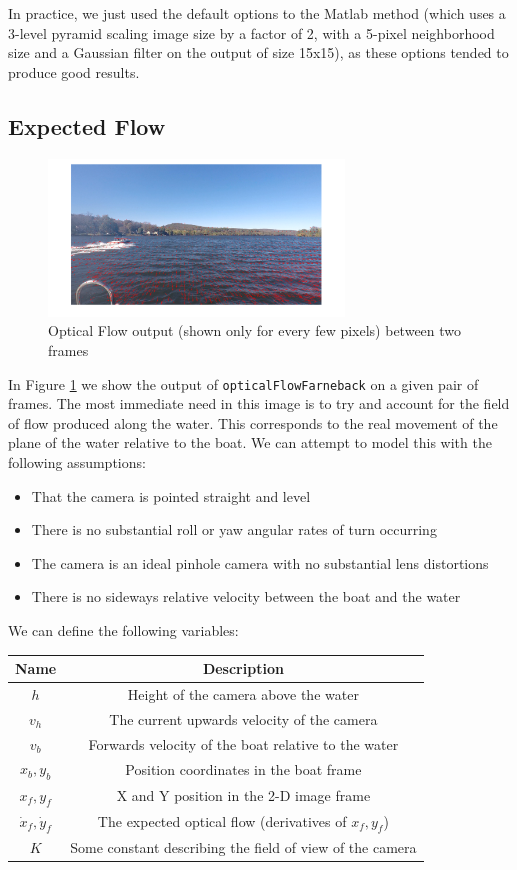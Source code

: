 \documentclass{article}
\begin{document}
In practice, we just used the default options to the Matlab method (which uses
a 3-level pyramid scaling image size by a factor of 2, with a 5-pixel
neighborhood size and a Gaussian filter on the output of size 15x15), as these
options tended to produce good results.

\subsection{Expected Flow} \label{expected_flow}

\begin{figure}[H]
\centering
\includegraphics[width=0.7\textwidth]{example_flow.png}
\caption{Optical Flow output (shown only for every few pixels) between two
frames}
\label{fig:example_flow}
\end{figure}

In Figure \ref{fig:example_flow} we show the output of
\texttt{opticalFlowFarneback} on a given pair of frames. The most immediate need
in this image is to try and account for the field of flow produced along the
water. This corresponds to the real movement of the plane of the water relative
to the boat. We can attempt to model this with the following assumptions:
\begin{itemize}
\item That the camera is pointed straight and level
\item There is no substantial roll or yaw angular rates of turn occurring
\item The camera is an ideal pinhole camera with no substantial lens distortions
\item There is no sideways relative velocity between the boat and the water
\end{itemize}

We can define the following variables:

\begin{tabular}{c|c}
Name & Description \\ \hline
$h$ & Height of the camera above the water \\
$v_h$ & The current upwards velocity of the camera \\
$v_b$ & Forwards velocity of the boat relative to the water \\
$x_b, y_b$ & Position coordinates in the boat frame \\
$x_f, y_f$ & X and Y position in the 2-D image frame \\
$\dot{x}_f, \dot{y}_f$ & The expected optical flow (derivatives of $x_f, y_f$)
\\
$K$ & Some constant describing the field of view of the camera \\
\end{tabular}
\end{document}
